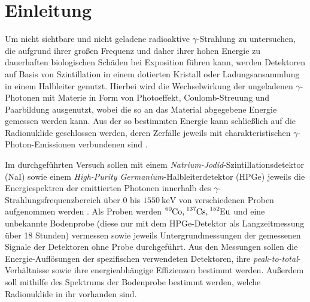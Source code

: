 \chapter{Einleitung}

Um nicht sichtbare und nicht geladene radioaktive $\gamma$-Strahlung zu untersuchen, die aufgrund ihrer großen Frequenz und daher ihrer hohen Energie zu dauerhaften biologischen Schäden bei Exposition führen kann, werden Detektoren auf Basis von Szintillation in einem dotierten Kristall oder Ladungsansammlung in einem Halbleiter genutzt. Hierbei wird die Wechselwirkung der ungeladenen $\gamma$-Photonen mit Materie in Form von Photoeffekt, Coulomb-Streuung und Paarbildung ausgenutzt, wobei die so an das Material abgegebene Energie gemessen werden kann. Aus der so bestimmten Energie kann schließlich auf die Radionuklide geschlossen werden, deren Zerfälle jeweils mit charakteristischen $\gamma$-Photon-Emissionen verbundenen sind \cite[518-520]{gammahandbook}.

Im durchgeführten Versuch sollen mit einem \textit{Natrium-Jodid}-Szintillationsdetektor (NaI) sowie einem \textit{High-Purity Germanium}-Halbleiterdetektor (HPGe) jeweils die Energiespektren der emittierten Photonen innerhalb des $\gamma$-Strahlungsfrequenzbereich über $0$ bis $\SI{1550}{\kilo\eV}$ von verschiedenen Proben aufgenommen werden \cite[1]{521versuchsanleitung}.
Als Proben werden $\ce{ ^60Co }, \ce{ ^137Cs }, \ce{ ^152Eu}$ \cite[3]{521versuchsanleitung} und eine unbekannte Bodenprobe (diese nur mit dem HPGe-Detektor als Langzeitmessung über 18 Stunden) vermessen sowie jeweils Untergrundmessungen der gemessenen Signale der Detektoren ohne Probe durchgeführt. Aus den Messungen sollen die Energie-Auflösungen der spezifischen verwendeten Detektoren,  ihre \textit{peak-to-total}-Verhältnisse sowie ihre energieabhängige Effizienzen bestimmt werden.
Außerdem soll mithilfe des Spektrums der Bodenprobe bestimmt werden, welche Radionuklide in ihr vorhanden sind.
